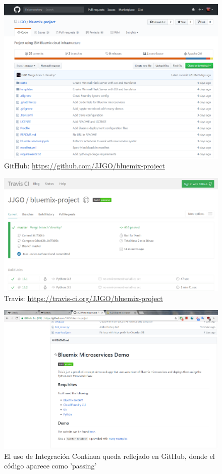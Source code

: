 \documentclass[a4paper]{article}
\begin{document}
\begin{figure}[htp!]
    \centering
    \caption{GitHub: \url{https://github.com/JJGO/bluemix-project}}
    \label{fig:git}
    \includegraphics[width=\textwidth]{git}
\end{figure}

\begin{figure}[htp!]
    \centering
    \caption{Travis: \url{https://travis-ci.org/JJGO/bluemix-project}}
    \label{fig:travis}
    \includegraphics[width=\textwidth]{travis}
\end{figure}

\begin{figure}[htp!]
    \centering
    \caption{El uso de Integración Continua queda reflejado en GitHub, donde el código aparece como 'passing'}
    \label{fig:git2}
    \includegraphics[width=\textwidth]{git2}
\end{figure}
\end{document}
